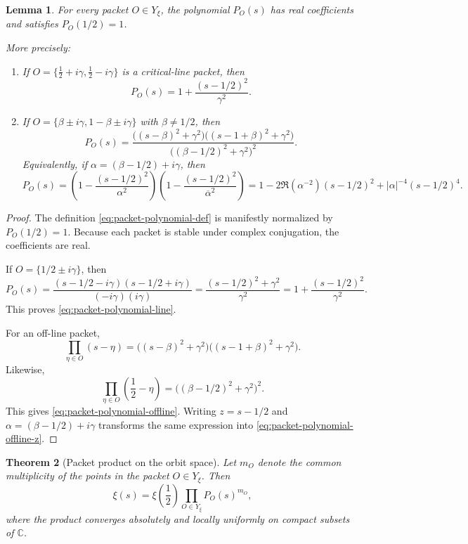 \documentclass[11pt,a4paper]{article}
\numberwithin{equation}{section}
\newtheorem{theorem}{Theorem}[section]
\newtheorem{lemma}[theorem]{Lemma}
\theoremstyle{definition}
\theoremstyle{remark}
\newcommand{\CC}{\mathbb C}
\begin{document}
\begin{lemma}\label{lem:packet-polynomial-explicit}
For every packet $O\in Y_\xi$, the polynomial $P_O(s)$ has real coefficients and satisfies $P_O(1/2)=1$.

More precisely:
\begin{enumerate}[label=(\roman*)]
\item If $O=\{\frac12+i\gamma,\frac12-i\gamma\}$ is a critical-line packet, then
\begin{equation}\label{eq:packet-polynomial-line}
P_O(s)=1+\frac{(s-1/2)^2}{\gamma^2}.
\end{equation}
\item If $O=\{\beta\pm i\gamma,1-\beta\pm i\gamma\}$ with $\beta\neq 1/2$, then
\begin{equation}\label{eq:packet-polynomial-offline}
P_O(s)=\frac{\bigl((s-\beta)^2+\gamma^2\bigr)\bigl((s-1+\beta)^2+\gamma^2\bigr)}{\bigl((\beta-1/2)^2+\gamma^2\bigr)^2}.
\end{equation}
Equivalently, if $\alpha=(\beta-1/2)+i\gamma$, then
\begin{equation}\label{eq:packet-polynomial-offline-z}
P_O(s)=\left(1-\frac{(s-1/2)^2}{\alpha^2}\right)\left(1-\frac{(s-1/2)^2}{\overline\alpha^2}\right)
=1-2\Re(\alpha^{-2})(s-1/2)^2+|\alpha|^{-4}(s-1/2)^4.
\end{equation}
\end{enumerate}
\end{lemma}

\begin{proof}
The definition \eqref{eq:packet-polynomial-def} is manifestly normalized by $P_O(1/2)=1$.  Because each packet is stable under complex conjugation, the coefficients are real.

If $O=\{1/2\pm i\gamma\}$, then
\[
P_O(s)=\frac{(s-1/2-i\gamma)(s-1/2+i\gamma)}{(-i\gamma)(i\gamma)}
=\frac{(s-1/2)^2+\gamma^2}{\gamma^2}
=1+\frac{(s-1/2)^2}{\gamma^2}.
\]
This proves \eqref{eq:packet-polynomial-line}.

For an off-line packet,
\[
\prod_{\eta\in O}(s-\eta)=\bigl((s-\beta)^2+\gamma^2\bigr)\bigl((s-1+\beta)^2+\gamma^2\bigr).
\]
Likewise,
\[
\prod_{\eta\in O}\left(\frac12-\eta\right)=\bigl((\beta-1/2)^2+\gamma^2\bigr)^2.
\]
This gives \eqref{eq:packet-polynomial-offline}.  Writing $z=s-1/2$ and $\alpha=(\beta-1/2)+i\gamma$ transforms the same expression into \eqref{eq:packet-polynomial-offline-z}.
\end{proof}

\begin{theorem}[Packet product on the orbit space]\label{thm:packet-product-on-Y}
Let $m_O$ denote the common multiplicity of the points in the packet $O\in Y_\xi$.  Then
\begin{equation}\label{eq:packet-product-on-Y}
\xi(s)=\xi\!\left(\frac12\right)\prod_{O\in Y_\xi} P_O(s)^{m_O},
\end{equation}
where the product converges absolutely and locally uniformly on compact subsets of $\CC$.
\end{theorem}
\end{document}
